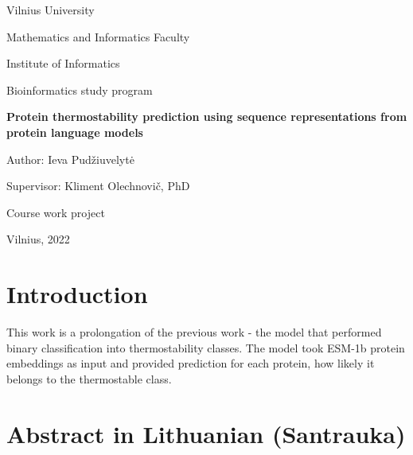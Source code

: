 \documentclass[12pt]{article}
\begin{document}
	\begin{center}

	    \vspace*{1cm}
	    \Large
	    Vilnius University

		Mathematics and Informatics Faculty

		Institute of Informatics 

		Bioinformatics study program
	    
        \vspace*{2cm}
        \Large
		\textbf{Protein thermostability prediction using 
		sequence representations from protein 
		language models}

	\end{center}

	\begin{flushright}

		\vspace*{2cm}
        \large
        Author: Ieva Pudžiuvelytė

        Supervisor: Kliment Olechnovič, PhD 
        
	\end{flushright}

	\begin{center}
		\vspace*{4cm}
        \large
        Course work project
        
        \vspace*{2cm}
        \large
        Vilnius, 2022
	\end{center}
	
	\newpage

	\tableofcontents

	\newpage
	
	\section{Introduction}

	This work is a prolongation of the previous work - the model 
	that performed binary classification into thermostability 
	classes. The model took ESM-1b protein embeddings as input 
	and provided prediction for each protein, how likely it 
	belongs to the thermostable class.
        
	\normalsize

	\newpage

	\section{Abstract in Lithuanian (Santrauka)}
\end{document}
